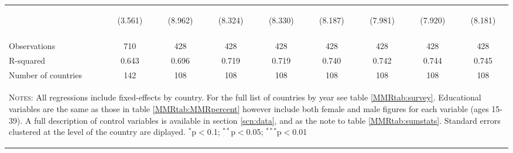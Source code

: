 \begin{landscape}
\begin{table}[htpb!]
\begin{center}
\begin{tabular}{lcccccccc}
&\begin{footnotesize}(3.561)\end{footnotesize}&\begin{footnotesize}(8.962)\end{footnotesize}&\begin{footnotesize}(8.324)\end{footnotesize}&\begin{footnotesize}(8.330)\end{footnotesize}&\begin{footnotesize}(8.187)\end{footnotesize}&\begin{footnotesize}(7.981)\end{footnotesize}&\begin{footnotesize}(7.920)\end{footnotesize}&\begin{footnotesize}(8.181)\end{footnotesize}\\
&&&&&&&&\\Observations&710&428&428&428&428&428&428&428\\
R-squared&0.643&0.696&0.719&0.719&0.740&0.742&0.744&0.745\\
Number of countries&142&108&108&108&108&108&108&108\\
\midrule
\multicolumn{9}{p{20cm}}{\begin{footnotesize}\textsc{Notes:} All regressions include fixed-effects by country. For the full list of countries by year see table \ref{MMRtab:survey}. Educational variables are the same as those in table \ref{MMRtab:MMRpercent} however include both female and male figures for each variable (ages 15-39). A full description of control variables is available in section \ref{scn:data}, and as the note to table \ref{MMRtab:sumstats}.  Standard errors clustered at the level of the country are diplayed.
$^{*}$p$<$0.1; $^{**}$p$<$0.05; $^{***}$p$<$0.01\end{footnotesize}} \\ \bottomrule 
\end{tabular}\end{center}\end{table}\end{landscape}